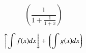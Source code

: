 \begin{InOut}
\begin{displaymath}
\left( \frac{1}{1+\frac{1}{1+x}} \right) 
\end{displaymath}
\end{InOut}


\begin{InOut}
\begin{displaymath}
 \left\uparrow \int f(x)dx 
   \right\downarrow + \left\lgroup 
     \int g(x)dx \right\rgroup
\end{displaymath}
\end{InOut}


